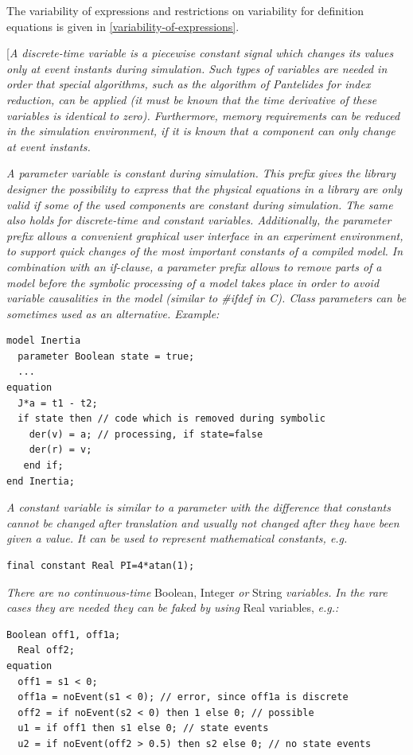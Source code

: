 \documentclass[10pt,a4paper]{report}
\begin{document}
The variability of expressions and restrictions on variability for
definition equations is given in \ref{variability-of-expressions}.

{[}\emph{A discrete-time variable is a piecewise constant signal which
changes its values only at event instants during simulation. Such types
of variables are needed in order that special algorithms, such as the
algorithm of Pantelides for index reduction, can be applied (it must be
known that the time derivative of these variables is identical to zero).
Furthermore, memory requirements can be reduced in the simulation
environment, if it is known that a component can only change at event
instants. }

\emph{A parameter variable is constant during simulation. This prefix
gives the library designer the possibility to express that the physical
equations in a library are only valid if some of the used components are
constant during simulation. The same also holds for discrete-time and
constant variables. Additionally, the parameter prefix allows a
convenient graphical user interface in an experiment environment, to
support quick changes of the most important constants of a compiled
model. In combination with an if-clause, a parameter prefix allows to
remove parts of a model before the symbolic processing of a model takes
place in order to avoid variable causalities in the model (similar to
\#ifdef in C). Class parameters can be sometimes used as an alternative.
Example: }
\begin{lstlisting}[language=modelica]
model Inertia
  parameter Boolean state = true;
  ...
equation
  J*a = t1 - t2;
  if state then // code which is removed during symbolic
    der(v) = a; // processing, if state=false
    der(r) = v;
   end if;
end Inertia;
\end{lstlisting}

\emph{A constant variable is similar to a parameter with the difference
that constants cannot be changed after translation and usually not
changed after they have been given a value. It can be used to represent
mathematical constants, e.g. }
\begin{lstlisting}[language=modelica]
final constant Real PI=4*atan(1);
\end{lstlisting}

\emph{There are no continuous-time} Boolean, Integer \emph{or} String
\emph{variables.} \emph{In the rare cases they are needed they can be
faked by using} Real variables, \emph{e.g.:}
\begin{lstlisting}[language=modelica]
  Boolean off1, off1a;
  Real off2;
equation
  off1 = s1 < 0;
  off1a = noEvent(s1 < 0); // error, since off1a is discrete
  off2 = if noEvent(s2 < 0) then 1 else 0; // possible
  u1 = if off1 then s1 else 0; // state events
  u2 = if noEvent(off2 > 0.5) then s2 else 0; // no state events
\end{lstlisting}
\end{document}
